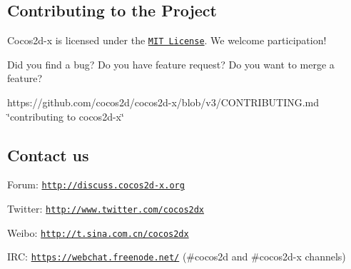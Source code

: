 \subsection*{Contributing to the Project }

Cocos2d-\/x is licensed under the \href{https://opensource.org/licenses/MIT}{\tt M\+IT License}. We welcome participation!

Did you find a bug? Do you have feature request? Do you want to merge a feature?


\begin{DoxyItemize}
\item https\+://github.com/cocos2d/cocos2d-\/x/blob/v3/\+C\+O\+N\+T\+R\+I\+B\+U\+T\+I\+N\+G.\+md \char`\"{}contributing to cocos2d-\/x\char`\"{}
\end{DoxyItemize}

\subsection*{Contact us }


\begin{DoxyItemize}
\item Forum\+: \href{http://discuss.cocos2d-x.org}{\tt http\+://discuss.\+cocos2d-\/x.\+org}
\item Twitter\+: \href{http://www.twitter.com/cocos2dx}{\tt http\+://www.\+twitter.\+com/cocos2dx}
\item Weibo\+: \href{http://t.sina.com.cn/cocos2dx}{\tt http\+://t.\+sina.\+com.\+cn/cocos2dx}
\item I\+RC\+: \href{https://webchat.freenode.net/}{\tt https\+://webchat.\+freenode.\+net/} (\#cocos2d and \#cocos2d-\/x channels) 
\end{DoxyItemize}